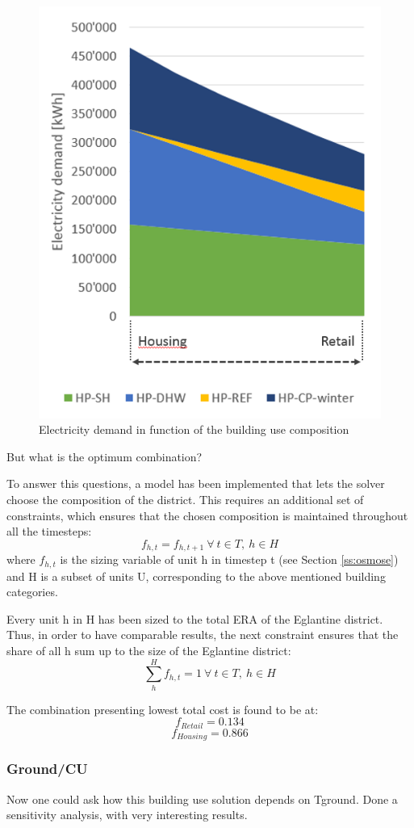 \documentclass{article}
\begin{document}
\begin{figure}[tph]
	\centering
	\includegraphics[width=0.45\linewidth]{Images/CU_el}
	\caption{Electricity demand in function of the building use composition}
	\label{fig:CU_el}
\end{figure}

But what is the optimum combination?

To answer this questions, a model has been implemented that lets the solver choose the composition of the district. This requires an additional set of constraints, which ensures that the chosen composition is maintained throughout all the timesteps:
\begin{equation}
f_{h,t} = f_{h,t+1} \ \forall \ t \in T, \ h \in H
\end{equation}
where $f_{h,t}$ is the sizing variable of unit h in timestep t (see Section \ref{ss:osmose}) and H is a subset of units U, corresponding to the above mentioned building categories.

Every unit h in H has been sized to the total ERA of the Eglantine district. Thus, in order to have comparable results, the next constraint ensures that the share of all h sum up to the size of the Eglantine district:
\begin{equation}
\sum_{h}^{H} f_{h,t} = 1 \ \forall \ t \in T, \ h \in H
\end{equation}

The combination presenting lowest total cost is found to be at:
$$f_{Retail} = 0.134$$
$$f_{Housing} = 0.866$$


\subsubsection{Ground/CU}
Now one could ask how this building use solution depends on Tground. Done a sensitivity analysis, with very interesting results.
\end{document}
